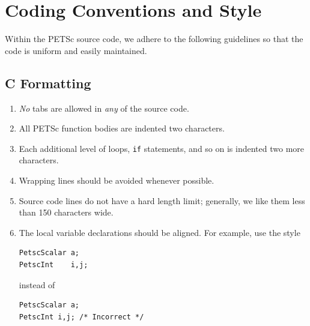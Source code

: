 \section{Coding Conventions and Style}
Within the PETSc source code, we adhere to the following guidelines
so that the code is uniform and easily maintained.

\subsection{C Formatting}
\begin{enumerate}
\item {\em No} tabs are allowed in {\em any} of the source code.
\item All PETSc function bodies are indented two characters.
\item Each additional level of loops, \lstinline{if} statements, and so on is indented
      two more characters.
\item Wrapping lines should be avoided whenever possible.
\item Source code lines do not have a hard length limit; generally, we like them less than 150 characters wide.
\item The local variable declarations should be aligned. For example,
      use the style
\begin{lstlisting}
PetscScalar a;
PetscInt    i,j;
\end{lstlisting}
instead of
\begin{lstlisting}
PetscScalar a;
PetscInt i,j; /* Incorrect */
\end{lstlisting}


\end{enumerate}
